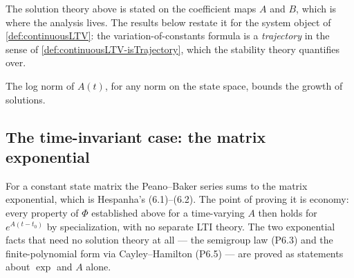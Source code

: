 The solution theory above is stated on the coefficient maps $A$ and $B$, which is where the
analysis lives. The results below restate it for the system object of
\cref{def:continuousLTV}: the variation-of-constants formula is a \emph{trajectory} in the
sense of \cref{def:continuousLTV-isTrajectory}, which the stability theory
quantifies over.
















The log norm of $A(t)$, for any norm on the state space, bounds the growth of solutions.





\subsection{The time-invariant case: the matrix exponential}

For a constant state matrix the Peano--Baker series sums to the matrix exponential, which is
Hespanha's (6.1)--(6.2). The point of proving it is economy: every property of $\Phi$ established
above for a time-varying $A$ then holds for $e^{A(t-t_0)}$ by specialization, with no separate LTI
theory. The two exponential facts that need no solution theory at all — the semigroup law (P6.3)
and the finite-polynomial form via Cayley--Hamilton (P6.5) — are proved as statements about
$\exp$ and $A$ alone.

